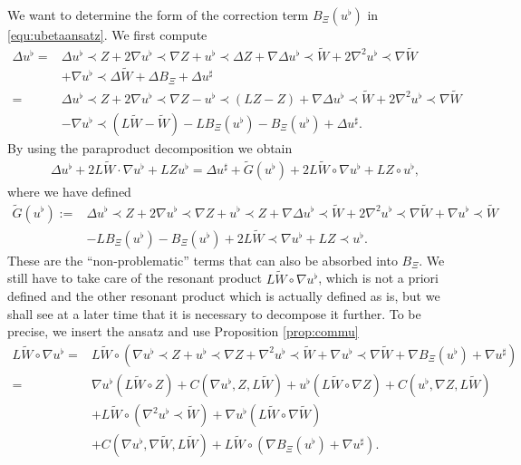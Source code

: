 \documentclass[11pt, oneside]{article}   	%
\newcommand{\assign}{:=}
\newcommand{\cdummy}{\cdot}
\begin{document}
We want to determine the form of the correction term $B_{\Xi}
(u^{\flat})$ in \eqref{equ:ubetaansatz}.  We first  compute
\begin{align*}
\Delta u^{\flat}  = & \Delta u^{\flat} \prec Z + 2 \nabla u^{\flat} \prec
\nabla Z + u^{\flat} \prec \Delta Z + \nabla \Delta u^{\flat} \prec
\widetilde{W} + 2 \nabla^2 u^{\flat} \prec \nabla \widetilde{W} \\&+ \nabla u^{\flat}
\prec \Delta \widetilde{W} + \Delta B_{\Xi} + \Delta u^{\sharp}\\
= & \Delta u^{\flat} \prec Z + 2 \nabla u^{\flat} \prec \nabla Z -
u^{\flat} \prec (  L Z-Z) + \nabla \Delta u^{\flat} \prec \widetilde{W} + 2
\nabla^2 u^{\flat} \prec \nabla \widetilde{W}\\& - \nabla u^{\flat} \prec
(  L \widetilde{W}-\widetilde{W}) - L B_{\Xi} (u^{\flat}) - B_{\Xi} (u^{\flat}) +
\Delta u^{\sharp}.
\end{align*}
By using the paraproduct decomposition we obtain
\begin{eqnarray}
\Delta u^{\flat} + 2 L \widetilde{W} \cdummy \nabla u^{\flat} + L
Zu^{\flat}  =  \Delta u^{\sharp} + \widetilde{G} (u^{\flat}) + 2 L
\widetilde{W} \circ \nabla u^{\flat} + L Z \circ u^{\flat}, \label{eqn:gtilde} 
\end{eqnarray}
where we have defined
\begin{align*}
\widetilde{G} (u^{\flat}) \assign& \Delta u^{\flat} \prec Z + 2 \nabla
u^{\flat} \prec \nabla Z + u^{\flat} \prec Z + \nabla \Delta u^{\flat}
\prec \widetilde{W} + 2 \nabla^2 u^{\flat} \prec \nabla \widetilde{W} + \nabla
u^{\flat} \prec \widetilde{W} \\&- L B_{\Xi} (u^{\flat}) - B_{\Xi} (u^{\flat}) + 2
L \widetilde{W} \prec \nabla u^{\flat} + L Z \prec u^{\flat}.
\end{align*}
These are the ``non-problematic'' terms that can also be absorbed into $B_{\Xi}$. We still have to take care of the resonant
product $L \widetilde{W} \circ \nabla u^{\flat}$, which is not a priori defined
and the other resonant product which is actually defined as is, but we shall
see at a later time that it is necessary to decompose it further. To be
precise, we insert the ansatz and use Proposition \ref{prop:commu}
\begin{align*}
L \widetilde{W} \circ \nabla u^{\flat}  = & L \widetilde{W} \circ (\nabla u^{\flat}
\prec Z + u^{\flat} \prec \nabla Z + \nabla^2 u^{\flat} \prec \widetilde{W} +
\nabla^{} u^{\flat} \prec \nabla \widetilde{W} + \nabla B_{\Xi} (u^{\flat}) +
\nabla u^{\sharp})\\
= & \nabla u^{\flat} (L \widetilde{W} \circ Z) + C (\nabla u^{\flat}, Z, L
\widetilde{W}) + u^{\flat} (L \widetilde{W} \circ \nabla Z) + C (u^{\flat}, \nabla
Z, L \widetilde{W})\\ &+ L \widetilde{W} \circ (\nabla^2 u^{\flat} \prec \widetilde{W}) +
\nabla u^{\flat} (L \widetilde{W} \circ \nabla \widetilde{W})\\ &+ C (\nabla u^{\flat},
\nabla \widetilde{W}, L \widetilde{W}) + L \widetilde{W} \circ (\nabla B_{\Xi}
(u^{\flat}) + \nabla u^{\sharp}) .
\end{align*}
\end{document}
